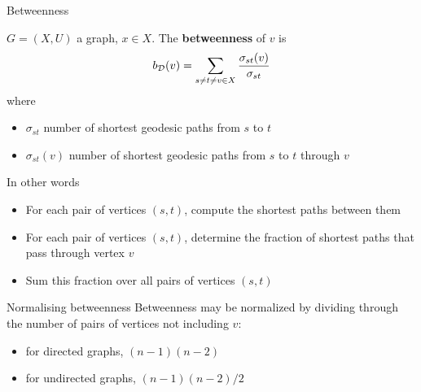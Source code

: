 \documentclass[aspectratio=43]{beamer}
\begin{document}
\begin{frame}{Betweenness}
\begin{definition}[Betweenness]
	$G=(X,U)$ a graph, $x\in X$. The \textbf{betweenness} of $v$ is
	\[
	b_{\mathcal{D}}(v)= \sum_{s\neq t\neq v  \in X} \frac{\sigma_{st}(v)}{\sigma_{st}}
	\]
	where
	\begin{itemize}
	\item $\sigma_{st}$ number of shortest geodesic paths from $s$ to $t$
	\item $\sigma_{st}(v)$ number of shortest geodesic paths from $s$ to $t$ through $v$
	\end{itemize}		
\end{definition}
\vfill
In other words
\begin{itemize}
	\item For each pair of vertices $(s,t)$, compute the shortest paths between them
	\item For each pair of vertices $(s,t)$, determine the fraction of shortest paths that pass through vertex $v$
	\item Sum this fraction over all pairs of vertices $(s,t)$
\end{itemize}
\end{frame}

\begin{frame}{Normalising betweenness}
	Betweenness may be normalized by dividing through the number of pairs of vertices not including $v$:
	\begin{itemize}
		\item for directed graphs, $(n-1)(n-2)$
		\item for undirected graphs, $(n-1)(n-2)/2$
	\end{itemize}
\end{frame}
\end{document}
